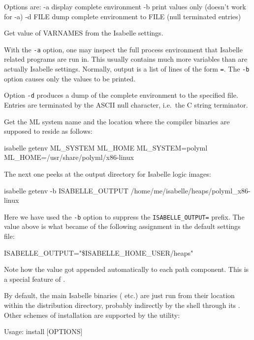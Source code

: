 \begin{isabellebody}
\begin{isamarkuptext}
\begin{ttbox}
  Options are:
    -a           display complete environment
    -b           print values only (doesn't work for -a)
    -d FILE      dump complete environment to FILE
                 (null terminated entries)

  Get value of VARNAMES from the Isabelle settings.
\end{ttbox}

  With the \verb|-a| option, one may inspect the full process
  environment that Isabelle related programs are run in. This usually
  contains much more variables than are actually Isabelle settings.
  Normally, output is a list of lines of the form \verb|=|. The \verb|-b| option
  causes only the values to be printed.

  Option \verb|-d| produces a dump of the complete environment
  to the specified file.  Entries are terminated by the ASCII null
  character, i.e.\ the C string terminator.%
\end{isamarkuptext}%
\isamarkuptrue%
%
\isamarkuptrue%
%
\begin{isamarkuptext}%
Get the ML system name and the location where the compiler binaries
  are supposed to reside as follows:
\begin{ttbox}
isabelle getenv ML_SYSTEM ML_HOME
{\out ML_SYSTEM=polyml}
{\out ML_HOME=/usr/share/polyml/x86-linux}
\end{ttbox}

  The next one peeks at the output directory for Isabelle logic
  images:
\begin{ttbox}
isabelle getenv -b ISABELLE_OUTPUT
{\out /home/me/isabelle/heaps/polyml_x86-linux}
\end{ttbox}
  Here we have used the \verb|-b| option to suppress the
  \verb|ISABELLE_OUTPUT=| prefix.  The value above is what
  became of the following assignment in the default settings file:
\begin{ttbox}
ISABELLE_OUTPUT="\$ISABELLE_HOME_USER/heaps"
\end{ttbox}

  Note how the \hyperlink{setting.ML-IDENTIFIER}{\mbox{}} value got appended
  automatically to each path component. This is a special feature of
  \hyperlink{setting.ISABELLE-OUTPUT}{\mbox{}}.%
\end{isamarkuptext}%
\isamarkuptrue%
%
\isamarkuptrue%
%
\begin{isamarkuptext}%
By default, the main Isabelle binaries (\hyperlink{executable.isabelle}{\mbox{}}
  etc.)  are just run from their location within the distribution
  directory, probably indirectly by the shell through its \hyperlink{setting.PATH}{\mbox{}}.  Other schemes of installation are supported by the
  \hypertarget{tool.install}{\hyperlink{tool.install}{\mbox{}}} utility:
\begin{ttbox}
Usage: install [OPTIONS]


\end{ttbox}
\end{isamarkuptext}
\end{isabellebody}
